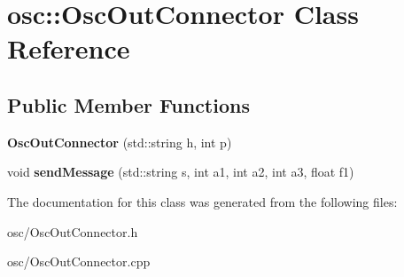 \hypertarget{classosc_1_1OscOutConnector}{}\section{osc\+:\+:Osc\+Out\+Connector Class Reference}
\label{classosc_1_1OscOutConnector}
\subsection*{Public Member Functions}
\begin{DoxyCompactItemize}
\item 
{\bfseries Osc\+Out\+Connector} (std\+::string h, int p)\hypertarget{classosc_1_1OscOutConnector_a7dde00203135c4a673e56f02dec774b4}{}\label{classosc_1_1OscOutConnector_a7dde00203135c4a673e56f02dec774b4}

\item 
void {\bfseries send\+Message} (std\+::string s, int a1, int a2, int a3, float f1)\hypertarget{classosc_1_1OscOutConnector_a8b3bcadf0295998b42753161ae9d17ee}{}\label{classosc_1_1OscOutConnector_a8b3bcadf0295998b42753161ae9d17ee}

\end{DoxyCompactItemize}


The documentation for this class was generated from the following files\+:\begin{DoxyCompactItemize}
\item 
osc/Osc\+Out\+Connector.\+h\item 
osc/Osc\+Out\+Connector.\+cpp\end{DoxyCompactItemize}
